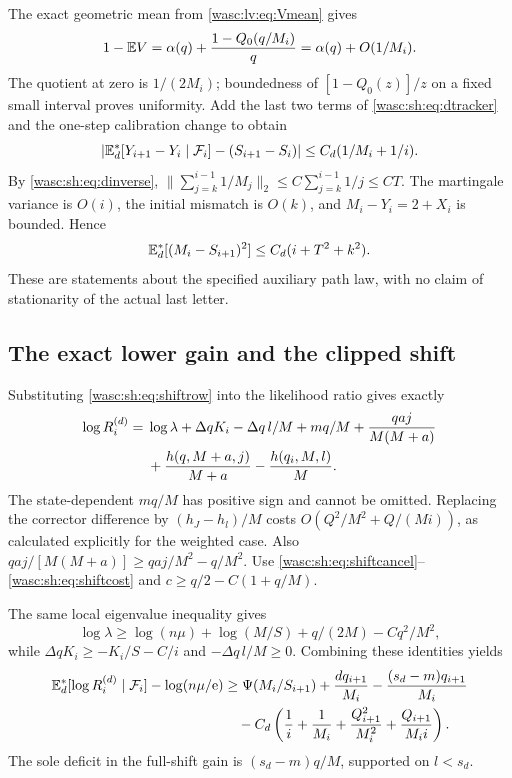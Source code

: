\documentclass[11pt,a4paper]{article}
\theoremstyle{remark}\newtheorem{remark}[theorem]{Remark}
\numberwithin{equation}{section}
\begin{document}
The exact geometric mean from \eqref{wasc:lv:eq:Vmean} gives
\[
1-\mathbb E V=\alpha(q)+\frac{1-Q_0(q/M_i)}q=\alpha(q)+O(1/M_i).
\]
The quotient at zero is $1/(2M_i)$; boundedness of $[1-Q_0(z)]/z$ on a fixed small interval proves uniformity. Add the last two terms of \eqref{wasc:sh:eq:dtracker} and the one-step calibration change to obtain
\[
\left|\mathbb E_d^*[Y_{i+1}-Y_i\mid\mathcal F_i]-(S_{i+1}-S_i)\right|
\le C_d(1/M_i+1/i).
\]
By \eqref{wasc:sh:eq:dinverse}, $\|\sum_{j=k}^{i-1}1/M_j\|_2\le C\sum_{j=k}^{i-1}1/j\le CT$. The martingale variance is $O(i)$, the initial mismatch is $O(k)$, and $M_i-Y_i=2+X_i$ is bounded. Hence
\begin{equation}\label{wasc:sh:eq:dtracking}
\mathbb E_d^*[(M_i-S_{i+1})^2]\le C_d(i+T^2+k^2).
\end{equation}
These are statements about the specified auxiliary path law, with no claim of stationarity of the actual last letter.

\subsection{The exact lower gain and the clipped shift}
Substituting \eqref{wasc:sh:eq:shiftrow} into the likelihood ratio gives exactly
\begin{align}\label{wasc:sh:eq:dexactR}
\log R_i^{(d)}={}&\log\lambda+\Delta qK_i-\Delta q\,l/M+mq/M
+\frac{qaj}{M(M+a)}\notag\\
&+\frac{h(q,M+a,j)}{M+a}-\frac{h(q_i,M,l)}M.
\end{align}
The state-dependent $mq/M$ has positive sign and cannot be omitted. Replacing the corrector difference by $(h_J-h_l)/M$ costs $O(Q^2/M^2+Q/(Mi))$, as calculated explicitly for the weighted case. Also $qaj/[M(M+a)]\ge qaj/M^2-q/M^2$. Use \eqref{wasc:sh:eq:shiftcancel}--\eqref{wasc:sh:eq:shiftcost} and $c\ge q/2-C(1+q/M)$.

The same local eigenvalue inequality gives
\[
\log\lambda\ge\log(n\mu)+\log(M/S)+q/(2M)-Cq^2/M^2,
\]
while $\Delta qK_i\ge-K_i/S-C/i$ and $-\Delta q\,l/M\ge0$. Combining these identities yields
\begin{align}\label{wasc:sh:eq:dlowerstep}
\mathbb E_d^*[\log R_i^{(d)}\mid\mathcal F_i]-\log(n\mu/\mathrm e)
&\ge\Psi(M_i/S_{i+1})+\frac{dq_{i+1}}{M_i}
-\frac{(s_d-m)q_{i+1}}{M_i}\notag\\
&\quad-C_d\left(\frac1i+\frac1{M_i}+\frac{Q_{i+1}^2}{M_i^2}
+\frac{Q_{i+1}}{M_i i}\right).
\end{align}
The sole deficit in the full-shift gain is $(s_d-m)q/M$, supported on $l<s_d$.
\end{document}

